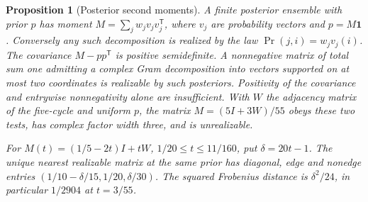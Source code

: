\documentclass[aps,pra,onecolumn,superscriptaddress,nofootinbib,10pt]{revtex4-2}
\newtheorem{proposition}[theorem]{Proposition}
\theoremstyle{definition}
\theoremstyle{remark}
\begin{document}
\begin{proposition}[Posterior second moments]\label{ob:posteriormoments}
A finite posterior ensemble with prior $p$ has moment
$M=\sum_j w_j v_jv_j^{\mathsf T}$, where $v_j$ are probability
vectors and $p=M\mathbf1$. Conversely any such decomposition is
realized by the law $\Pr(j,i)=w_jv_j(i)$. The covariance
$M-pp^{\mathsf T}$ is positive semidefinite.
A nonnegative matrix of total sum one admitting a complex Gram
decomposition into vectors supported on at most two coordinates
is realizable by such posteriors. Positivity of the covariance and
entrywise nonnegativity alone are insufficient. With $W$ the adjacency
matrix of the five-cycle and uniform $p$, the matrix $M=(5I+3W)/55$
obeys these two tests, has complex factor width three, and is unrealizable.

For $M(t)=(1/5-2t)I+tW$, $1/20\le t\le11/160$, put
$\delta=20t-1$. The unique nearest realizable matrix at the same
prior has diagonal, edge and nonedge entries
$(1/10-\delta/15,1/20,\delta/30)$. The squared Frobenius
distance is $\delta^2/24$, in particular $1/2904$ at $t=3/55$.
\end{proposition}
\end{document}

